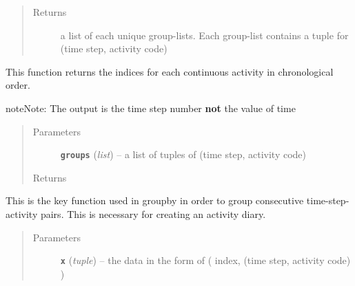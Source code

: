 \documentclass[letterpaper,10pt,english]{sphinxmanual}
\begin{document}
\begin{fulllineitems}
\begin{fulllineitems}
\begin{quote}
\begin{description}
\item[{Returns}] \leavevmode
a list of each unique group-lists. Each group-list contains a tuple         for (time step, activity code)

\end{description}\end{quote}

\end{fulllineitems}


\begin{fulllineitems}
\label{diary:diary.Diary.group_activity_indices}
This function returns the indices for each continuous activity in chronological order.

\begin{notice}{note}{Note:}
The output is the time step number \textbf{not} the value of time
\end{notice}
\begin{quote}\begin{description}
\item[{Parameters}] \leavevmode
\textbf{\texttt{groups}} (\emph{list}) -- a list of tuples of (time step, activity code)

\item[{Returns}] \leavevmode


\end{description}\end{quote}

\end{fulllineitems}


\begin{fulllineitems}
\label{diary:diary.Diary.group_activity_key}
This is the key function used in groupby in order to group consecutive time-step-activity pairs. This is         necessary for creating an activity diary.
\begin{quote}\begin{description}
\item[{Parameters}] \leavevmode
\textbf{\texttt{x}} (\emph{tuple}) -- the data in the form of ( index, (time step, activity code) )

\end{description}\end{quote}


\end{fulllineitems}
\end{fulllineitems}
\end{document}
